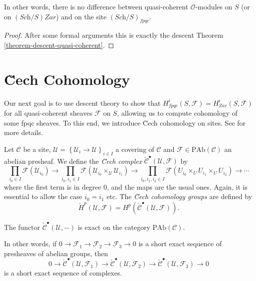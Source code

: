 \noindent
In other words, there is no difference between quasi-coherent
$\mathcal{O}$-modules on $S$ (or on $(\textit{Sch}/S)Zar$) and on the site
$(\textit{Sch}/S)_{fpqc}$.

\begin{proof}
After some formal arguments this is exactly the descent Theorem
\ref{theorem-descent-quasi-coherent}.
\end{proof}





\section{\u Cech Cohomology}
\label{section-cech-cohomology}

\noindent
Our next goal is to use descent theory to show that $H_{fpqc}^i(S, \mathcal{F})
= H_{Zar}^i(S, \mathcal{F})$ for all quasi-coherent sheaves $\mathcal{F}$ on
$S$, allowing us to compute cohomology of some fpqc sheaves. To this end, we
introduce \u Cech cohomology on sites. See \cite{ArtinTopologies} for more
details.

\begin{definition}
\label{definition-cech-complex}
Let $\mathcal{C}$ be a site, $\mathcal{U}=\left\{\mathcal{U}_i\to
\mathcal{U}\right\}_{i\in I}$ a covering of $\mathcal{C}$ and $\mathcal{F}\in
\text{PAb}(\mathcal{C})$ an abelian presheaf. We define the
{\it \u Cech complex}
$\check{\mathcal{C}}^\bullet(\mathcal{U}, \mathcal{F})$ by
$$
\prod_{i_0\in I}\mathcal{F}(\mathcal{U}_{i_0}) \to \prod_{i_0,
i_1\in I}\mathcal{F}\left(\mathcal{U}_{i_0}\times_{\mathcal{U}}
\mathcal{U}_{i_1}\right) \to \prod_{i_0, i_1, i_2 \in I}
\mathcal{F}\left(U_{i_0}\times_U U_{i_1} \times_U U_{i_2}\right) \to \cdots
$$
where the first term is in degree 0, and the maps are the usual ones. Again, it
is essential to allow the case $i_0 = i_1$ etc. The
{\it \u Cech cohomology groups} are defined by
$$
\check{H}^p(\mathcal{U}, \mathcal{F})=
H^p(\check{\mathcal{C}}^\bullet\left(\mathcal{U}, \mathcal{F}\right)).
$$
\end{definition}

\begin{lemma}
\label{lemma-cech-presheaves}
The functor $\check{\mathcal{C}}^\bullet(\mathcal{U}, -)$ is exact on the
category $\text{PAb}(\mathcal{C})$.
\end{lemma}	

\noindent
In other words, if $0\to \mathcal{F}_1\to \mathcal{F}_2\to \mathcal{F}_3\to 0$
is a short exact sequence of presheaves of abelian groups, then
$$
0 \to \check{\mathcal{C}}^\bullet\left(\mathcal{U}, \mathcal{F}_1\right)
\to\check{\mathcal{C}}^\bullet(\mathcal{U}, \mathcal{F}_2) \to
\check{\mathcal{C}}^\bullet(\mathcal{U}, \mathcal{F}_3)\to 0
$$
is a short exact sequence of complexes.

